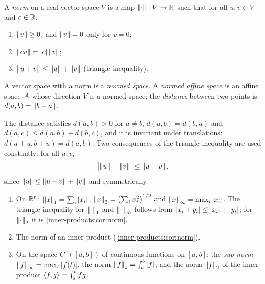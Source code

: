 \begin{notechapter}
\begin{definition}[Norm]\label{norms-banach:def:norm}
A \emph{norm} on a real vector space $V$ is a map $\left\|\cdot\right\|:V\to\mathbb{R}$ such
that for all $u, v\in V$ and $c\in\mathbb{R}$:
\begin{enumerate}[nosep]
  \item $\left\|v\right\|\geq0$, and $\left\|v\right\| = 0$ only for $v = 0$;
  \item $\left\|cv\right\| = \left|c\right|\left\|v\right\|$;
  \item $\left\|u + v\right\|\leq\left\|u\right\| + \left\|v\right\|$ (triangle inequality).
\end{enumerate}
A vector space with a norm is a \emph{normed space}. A \emph{normed affine
space} is an affine space $\mathcal{A}$ whose direction $V$ is a normed space; the
\emph{distance} between two points is $d(a, b) = \left\|b - a\right\|$.
\end{definition}

The distance satisfies $d(a, b) > 0$ for $a\neq b$, $d(a, b) = d(b, a)$
and $d(a, c)\leq d(a, b) + d(b, c)$, and it is invariant under
translations: $d(a + u, b + u) = d(a, b)$. Two consequences of the triangle
inequality are used constantly: for all $u, v$,
\begin{equation}\label{norms-banach:eq:reverse}
  \bigl|\left\|u\right\| - \left\|v\right\|\bigr|\leq\left\|u - v\right\| ,
\end{equation}
since $\left\|u\right\|\leq\left\|u - v\right\| + \left\|v\right\|$ and symmetrically.

\begin{example}
\label{norms-banach:ex:norms}
\begin{enumerate}[nosep]
  \item On $\mathbb{R}^n$:
        $\left\|x\right\|_1 = \sum_i\left|x_i\right|$,
        $\left\|x\right\|_2 = \bigl(\sum_ix_i^2\bigr)^{1/2}$ and
        $\left\|x\right\|_\infty = \max_i\left|x_i\right|$. The triangle inequality for
        $\left\|\cdot\right\|_1$ and $\left\|\cdot\right\|_\infty$ follows from
        $\left|x_i + y_i\right|\leq\left|x_i\right| + \left|y_i\right|$; for $\left\|\cdot\right\|_2$ it
        is \cref{inner-products:cor:norm}.
  \item The norm of an inner product (\cref{inner-products:cor:norm}).
  \item On the space $C^0([a, b])$ of continuous functions on $[a, b]$:
        the \emph{sup norm} $\left\|f\right\|_\infty = \max_{t}\left|f(t)\right|$, the norm
        $\left\|f\right\|_1 = \int_a^b\left|f\right|$, and the norm $\left\|f\right\|_2$ of the inner
        product $\left\langle f, g \right\rangle = \int_a^bfg$.
\end{enumerate}
\end{example}


\end{notechapter}
